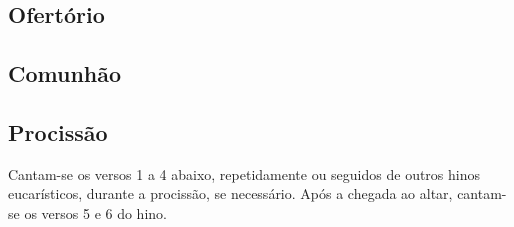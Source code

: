 \subsection{Ofertório}\label{subsection:tempus-per-annum/sanctissimi-corporis-et-sanguinis-christi/offertorium}

\AllowPageFlush

\subsection{Comunhão}\label{subsection:tempus-per-annum/sanctissimi-corporis-et-sanguinis-christi/communio}

\subsection{Procissão}\label{subsection:tempus-per-annum/sanctissimi-corporis-et-sanguinis-christi/ad-processionem}
\begin{rubrica}
  Cantam-se os versos 1 a 4 abaixo, repetidamente ou seguidos de outros hinos eucarísticos, durante a procissão, se necessário. Após a chegada ao altar, cantam-se os versos 5 e 6 do hino.
\end{rubrica}
